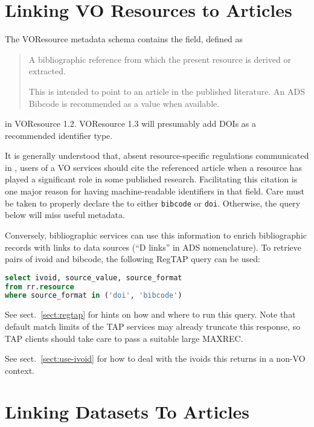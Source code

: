 \documentclass[11pt,a4paper]{ivoa}
\begin{document}
\section{Linking VO Resources to Articles}

The VOResource metadata schema \citep{2018ivoa.spec.0625P} contains the
 field, defined as

\begin{quotation}
\noindent A bibliographic reference from which the present resource is
derived or extracted.

\noindent This is intended to point to an article in the published
literature. An ADS Bibcode is recommended as a value when available.
\end{quotation}

\noindent in VOResource 1.2.  VOResource 1.3 will presumably add DOIs as a
recommended identifier type.

It is generally understood that, absent resource-specific regulations
communicated in , users of a VO services should cite the
referenced article when a resource has played a significant role in some
published research.  Facilitating this citation is one major reason for
having machine-readable identifiers in that field.  Care must be taken
to properly declare the  to either \verb|bibcode|
or \verb|doi|. Otherwise, the query below will miss useful metadata.

Conversely, bibliographic services can use this information to enrich
bibliographic records with links to data sources (``D links'' in ADS
nomenclature).  To retrieve pairs of ivoid and bibcode, the following
RegTAP \citep{2019ivoa.spec.1011D} query can be used:

\begin{lstlisting}[language=SQL]
select ivoid, source_value, source_format
from rr.resource
where source_format in ('doi', 'bibcode')
\end{lstlisting}

See sect.~\ref{sect:regtap} for hints on how and where to run this
query.
Note that default match limits of the TAP services may already
truncate this response, so TAP clients should take care to pass a
suitable large MAXREC.

See sect.~\ref{sect:use-ivoid} for how to deal with the ivoids this
returns in a non-VO context.


\section{Linking Datasets To Articles}
\label{sect:res-art}
\end{document}
